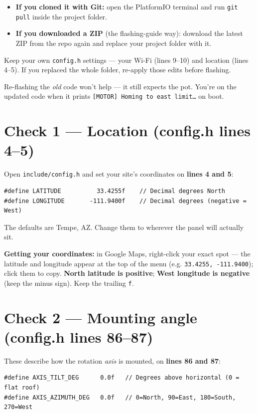 \documentclass[11pt]{article}
\begin{document}
\begin{itemize}[leftmargin=1.6em]
  \item \textbf{If you cloned it with Git:} open the PlatformIO terminal and run
        \texttt{git pull} inside the project folder.
  \item \textbf{If you downloaded a ZIP} (the flashing-guide way): download the latest
        ZIP from the repo again and replace your project folder with it.
\end{itemize}

\begin{warn}
Keep your own \texttt{config.h} settings --- your Wi-Fi (lines 9--10) and location
(lines 4--5). If you replaced the whole folder, re-apply those edits before flashing.
\end{warn}

\begin{note}
Re-flashing the \emph{old} code won't help --- it still expects the pot. You're on the
updated code when it prints \texttt{[MOTOR] Homing to east limit\ldots} on boot.
\end{note}

\section{Check 1 --- Location (config.h lines 4--5)}
Open \texttt{include/config.h} and set your site's coordinates on
\textbf{lines 4 and 5}:
\begin{lstlisting}
#define LATITUDE          33.4255f    // Decimal degrees North
#define LONGITUDE       -111.9400f    // Decimal degrees (negative = West)
\end{lstlisting}
The defaults are Tempe, AZ. Change them to wherever the panel will actually sit.

\begin{tip}
\textbf{Getting your coordinates:} in Google Maps, right-click your exact spot ---
the latitude and longitude appear at the top of the menu (e.g. \texttt{33.4255,
-111.9400}); click them to copy. \textbf{North latitude is positive}; \textbf{West
longitude is negative} (keep the minus sign). Keep the trailing \texttt{f}.
\end{tip}

\section{Check 2 --- Mounting angle (config.h lines 86--87)}
These describe how the rotation \emph{axis} is mounted, on \textbf{lines 86 and 87}:
\begin{lstlisting}
#define AXIS_TILT_DEG      0.0f   // Degrees above horizontal (0 = flat roof)
#define AXIS_AZIMUTH_DEG   0.0f   // 0=North, 90=East, 180=South, 270=West
\end{lstlisting}
\end{document}
